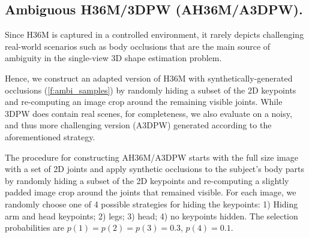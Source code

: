\subsection{Ambiguous H36M/3DPW (AH36M/A3DPW).}
Since H36M is captured in a controlled environment, it rarely depicts challenging real-world scenarios such as body occlusions that are the main source of ambiguity in the single-view 3D shape estimation problem. 

Hence, we construct an adapted version of H36M with synthetically-generated occlusions (\cref{f:ambi_samples}) by randomly hiding a subset of the 2D keypoints and re-computing an image crop around the remaining visible joints. While 3DPW does contain real scenes, for completeness, we also evaluate on a noisy, and thus more challenging version (A3DPW) generated according to the aforementioned strategy. 

The procedure for constructing AH36M/A3DPW starts with the full size image with a set of 2D joints and apply synthetic occlusions to the subject's body parts by randomly hiding a subset of the 2D keypoints and re-computing a slightly padded image crop around the joints that remained visible. 
For each image, we randomly choose one of 4 possible strategies for hiding the keypoints: 1) Hiding arm and head keypoints; 2) legs; 3) head; 4) no keypoints hidden. The selection probabilities are $p(1)=p(2)=p(3)=0.3$, $p(4)=0.1$.







